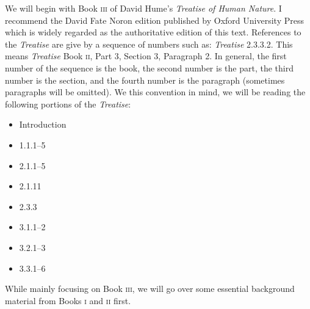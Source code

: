 
We will begin with Book \textsc{iii} of David Hume's \emph{Treatise of Human Nature}. I recommend the David Fate Noron edition published by Oxford University Press which is widely regarded as the authoritative edition of this text. References to the \emph{Treatise} are give by a sequence of numbers such as: \emph{Treatise} 2.3.3.2. This means \emph{Treatise} Book \textsc{ii}, Part 3, Section 3, Paragraph 2. In general, the first number of the sequence is the book, the second number is the part, the third number is the section, and the fourth number is the paragraph (sometimes paragraphs will be omitted). We this convention in mind, we will be reading the following portions of the \emph{Treatise}:
\begin{itemize}
    \item \alert{Introduction}
    \item \alert{1.1.1--5}
    \item \alert{2.1.1--5}
    \item \alert{2.1.11}
    \item \alert{2.3.3}
    \item \alert{3.1.1--2}
    \item \alert{3.2.1--3}
    \item \alert{3.3.1--6}
\end{itemize}
While mainly focusing on Book \textsc{iii}, we will go over some essential background material from Books \textsc{i} and \textsc{ii} first. \change

